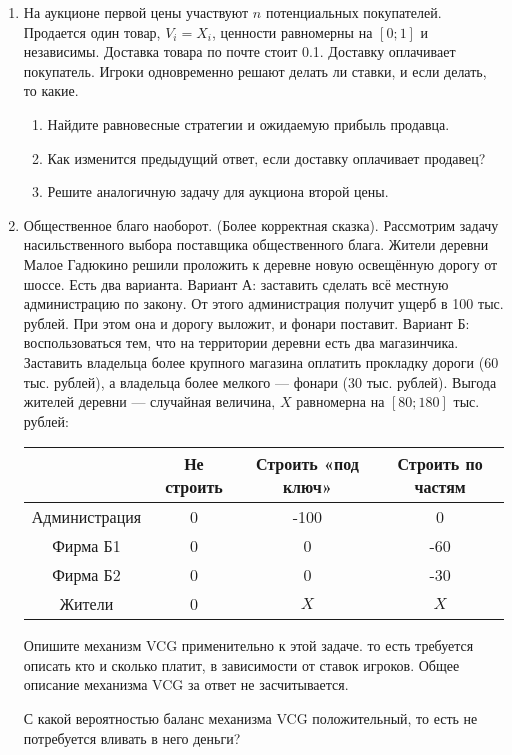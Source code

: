 \begin{enumerate}
\item На аукционе первой цены участвуют $ n $ потенциальных покупателей. Продается один товар, $ V_{i}=X_{i} $, ценности равномерны на $ [0;1] $ и независимы. Доставка товара по почте стоит 0.1. Доставку оплачивает покупатель. Игроки одновременно решают делать ли ставки, и если делать, то какие.

\begin{enumerate}
\item Найдите равновесные стратегии и ожидаемую прибыль продавца.
\item Как изменится предыдущий ответ, если доставку оплачивает продавец?
\item Решите аналогичную задачу для аукциона второй цены.
\end{enumerate}


\item Общественное благо наоборот. (Более корректная сказка). Рассмотрим задачу насильственного выбора поставщика общественного блага. Жители деревни Малое Гадюкино решили проложить к деревне новую освещённую дорогу от шоссе. Есть два варианта. Вариант А: заставить сделать всё местную администрацию по закону. От этого администрация получит ущерб в 100 тыс. рублей. При этом она и дорогу выложит, и фонари поставит. Вариант Б: воспользоваться тем, что на территории деревни есть два магазинчика. Заставить владельца более крупного магазина оплатить прокладку дороги (60 тыс. рублей), а владельца более мелкого — фонари (30 тыс. рублей). Выгода жителей деревни — случайная величина, $ X $ равномерна на $ [80;180] $ тыс. рублей:

\begin{tabular}{c|ccc}
& Не строить & Строить «под ключ» & Строить по частям \\
\hline
Администрация & 0 & -100 & 0\\
Фирма Б1 & 0 & 0 & -60\\
Фирма Б2 & 0 & 0 & -30\\
Жители & 0 & $X$ & $X$\\
\end{tabular}

Опишите механизм VCG применительно к этой задаче. то есть требуется описать кто и сколько платит, в зависимости от ставок игроков. Общее описание механизма VCG за ответ не засчитывается.

С какой вероятностью баланс механизма VCG положительный, то есть не потребуется вливать в него деньги?



\end{enumerate}
